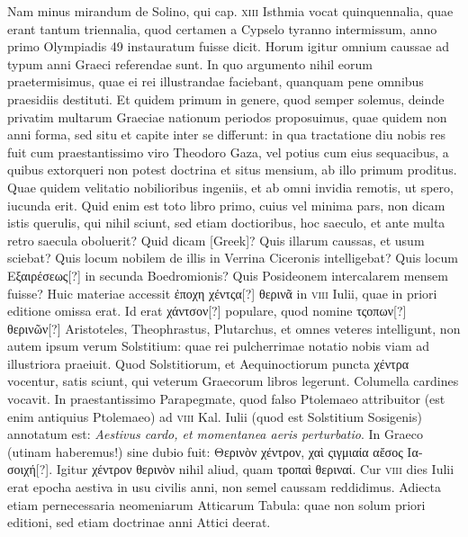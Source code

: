 Nam minus mirandum de Solino, qui cap. \textsc{xiii} Isthmia vocat
quinquennalia, quae erant tantum triennalia, quod certamen a Cypselo
tyranno intermissum, anno primo Olympiadis 49 instauratum
fuisse dicit.
Horum igitur omnium caussae ad typum anni Graeci referendae
sunt.
In quo argumento nihil eorum praetermisimus, quae
ei rei illustrandae faciebant, quanquam pene omnibus praesidiis
destituti.
Et quidem primum in genere, quod semper solemus, deinde
privatim multarum Graeciae nationum periodos proposuimus,
quae quidem non anni forma, sed situ et capite inter se differunt: in
qua tractatione diu nobis res fuit cum praestantissimo viro Theodoro
Gaza, vel potius cum eius sequacibus, a quibus extorqueri non
potest doctrina et situs mensium, ab illo primum proditus. 
Quae quidem
velitatio nobilioribus ingeniis, et ab omni invidia remotis, ut
spero, iucunda erit.
Quid enim est toto libro primo, cuius vel minima
pars, non dicam istis querulis, qui nihil sciunt, sed etiam doctioribus,
hoc saeculo, et ante multa retro saecula oboluerit?
Quid dicam \textgreek{[Greek]}?
Quis illarum caussas, et usum sciebat?
Quis
locum nobilem de illis in Verrina Ciceronis intelligebat?
Quis locum
\textgreek{Εξαιρέσεως[?]} in secunda Boedromionis?
Quis Posideonem intercalarem
mensem fuisse?
Huic materiae accessit \textgreek{ἐποχη χέντςα[?] θερινᾶ}
in \textsc{viii} Iulii, quae in priori editione omissa erat.
Id erat \textgreek{χάντσον[?]}
populare, quod nomine \textgreek{τςοπων[?] θερινῶν[?]}
 Aristoteles, Theophrastus,
Plutarchus, et omnes veteres intelligunt, non autem ipsum verum
Solstitium: quae rei pulcherrimae notatio nobis viam ad illustriora
praeiuit.
Quod Solstitiorum, et Aequinoctiorum puncta \textgreek{χέντρα} vocentur,
satis sciunt, qui veterum Graecorum libros legerunt.
Columella
cardines vocavit.
In praestantissimo Parapegmate, quod falso
Ptolemaeo attribuitor (est enim antiquius Ptolemaeo) ad \textsc{viii} Kal.
Iulii (quod est Solstitium Sosigenis) annotatum est: \textit{Aestivus cardo,
et momentanea aeris perturbatio}.
In Graeco (utinam haberemus!)
sine dubio fuit: \textgreek{Θερινὸν χέντρον, χαὶ ςιγμιαία αἔσος Ιασοιχή[?]}.
Igitur \textgreek{χέντρον
θερινὸν} nihil aliud, quam \textgreek{τροπαὶ θεριναί}.
Cur \textsc{viii} dies Iulii erat
epocha aestiva in usu civilis anni, non semel caussam reddidimus. 
Adiecta etiam pernecessaria neomeniarum Atticarum Tabula: quae
non solum priori editioni, sed etiam doctrinae anni Attici deerat.

